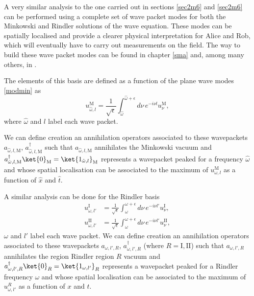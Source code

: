 A very similar analysis to the one carried out in sections \ref{sec2m6} and \ref{sec2m6} can be performed using a complete set of wave packet modes for both the Minkowski and Rindler solutions of the wave equation. These modes can be spatially localised and provide a clearer physical interpretation for Alice and Rob, which will eventually have to carry out measurements on the field. The way to build these wave packet modes can be found in chapter \ref{sma} and, among many others, in \cite{Birrell,Takagi,NavarroSalas}.

The elements of this basis are defined as a function of the plane wave modes \eqref{modmin} as
\begin{equation}
u^{\text{M}}_{\hat\omega,l}=\frac{1}{\sqrt{\epsilon}}\int_{\hat \omega}^{\hat \omega+\epsilon}d\nu\, e^{-i \nu l}u^{\text{M}}_{\nu},
\end{equation}
where $\hat\omega$ and $l$ label each wave packet.
 
 We can define creation an annihilation operators associated to these wavepackets $a_{\hat \omega,l,\text{M}}$, $a_{\hat\omega,l,\text{M}}^\dagger$  such that $a_{\hat\omega,l,\text{M}}$ annihilates the Minkowski vacuum and $a_{\hat\omega,l,\text{M}}^\dagger \ket{0}_\text{M}=\ket{1_{\hat\omega,l}}_\text{M}$ represents a wavepacket peaked for a frequency $\hat \omega$ and whose spatial localisation can be associated to the maximum of $u^{\text{M}}_{\omega,l}$ as a function of $\hat x$ and $\hat t$.
 
A similar analysis can be done for the Rindler basis
\begin{align}
\nonumber u^{\text{I}}_{\omega,l'}&=\frac{1}{\sqrt{\epsilon}}\int_{\omega}^{ \omega+\epsilon}d\nu\, e^{-i \nu l'}u^{\text{I}}_{\nu},\\
u^{\text{II}}_{\omega,l'}&=\frac{1}{\sqrt{\epsilon}}\int_{\omega}^{ \omega+\epsilon}d\nu\, e^{-i \nu l'}u^{\text{II}}_{\nu},
\end{align}
 $\omega$ and $l'$ label each wave packet.  We can define creation an annihilation operators associated to these wavepackets $a_{\omega,l',R}$, $a_{\omega,l',R}^\dagger$ (where $R=\text{I},\text{II}$) such that $a_{\omega,l',R}$ annihilates the region Rindler region $R$ vacuum and $a_{\omega,l',R}^\dagger \ket{0}_R=\ket{1_{\omega,l'}}_R$ represents a wavepacket peaked for a Rindler frequency $\omega$ and whose spatial localisation can be associated to the maximum of $u^R_{\omega,l'}$ as a function of $x$ and $t$.
 
